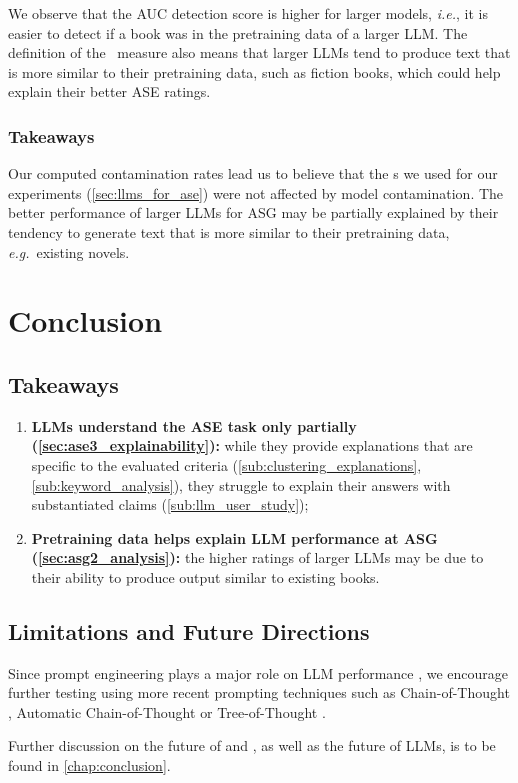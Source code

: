We observe that the AUC detection score is higher for larger models, \textit{i.e.}, it is easier to detect if a book was in the pretraining data of a larger LLM. The definition of the \minkprob\ measure also means that larger LLMs tend to produce text that is more similar to their pretraining data, such as fiction books, which could help explain their better ASE ratings.

\subsubsection{Takeaways} 

Our computed contamination rates lead us to believe that the {\llm}s we used for our {\ase} experiments (\autoref{sec:llms_for_ase}) were not affected by model contamination. The better performance of larger LLMs for ASG may be partially explained by their tendency to generate text that is more similar to their pretraining data, \textit{e.g.}\ existing novels.

\section{Conclusion}
\label{sec:expl_conclusion}

\subsection{Takeaways}

\begin{enumerate}
    \item \textbf{LLMs understand the ASE task only partially (\autoref{sec:ase3_explainability}):} while they provide explanations that are specific to the evaluated criteria (\autoref{sub:clustering_explanations}, \autoref{sub:keyword_analysis}), they struggle to explain their answers with substantiated claims (\autoref{sub:llm_user_study});
    \item \textbf{Pretraining data helps explain LLM performance at ASG (\autoref{sec:asg2_analysis}):} the higher ratings of larger LLMs may be due to their ability to produce output similar to existing books.
\end{enumerate}

\subsection{Limitations and Future Directions}

Since prompt engineering plays a major role on LLM performance \citep{tonmoy2024comprehensive, chen2023unleashing, liu2023pretrain}, we encourage further testing using more recent prompting techniques such as Chain-of-Thought \citep{wei2022chain}, Automatic Chain-of-Thought \citep{zhang2023automatic} or Tree-of-Thought \citep{yao2023tree}.

Further discussion on the future of {\asgfull} and {\asefull}, as well as the future of LLMs, is to be found in \autoref{chap:conclusion}.